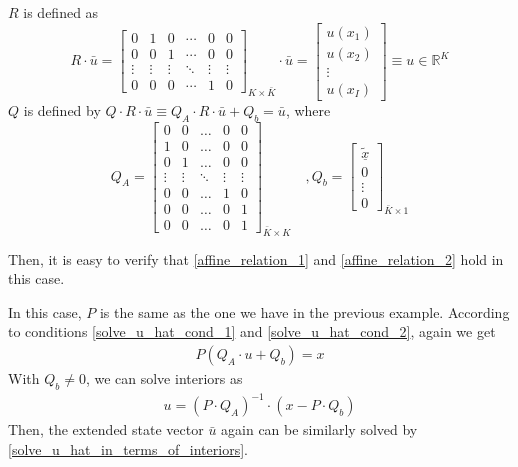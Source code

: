 \documentclass[11pt]{article}
\newcommand{\R}{\ensuremath{\mathbb{R}}}
\begin{document}
$R$ is defined as
\begin{equation}
R\cdot \bar{u} =\begin{bmatrix}
0&1&0&\cdots&0&0\\
0&0&1&\cdots&0&0\\
\vdots&\vdots&\vdots&\ddots&\vdots&\vdots\\
0&0&0&\cdots&1&0
\end{bmatrix}_{K\times\bar{K}}\cdot \bar{u}
=\begin{bmatrix}
u(x_1)\\
u(x_2)\\
\vdots\\
u(x_I)
\end{bmatrix} \equiv u\in \R^{K}
\end{equation}
$Q$ is defined by $Q\cdot R\cdot\bar{u}\equiv Q_A\cdot R\cdot\bar{u}+Q_b = \bar{u}$, where
\begin{equation}
Q_A = \begin{bmatrix}
0& 0&\dots&0&0\\
1&0&\dots&0&0\\
0&1&\dots&0&0\\
\vdots&\vdots&\ddots&\vdots&\vdots\\
0&0&\dots&1&0\\
0&0&\dots&0&1\\
0&0&\dots&0&1
\end{bmatrix}_{\bar{K}\times K}\quad , Q_b = \begin{bmatrix}
\underline{\tilde{x}}\\
0\\
\vdots\\
0
\end{bmatrix}_{\bar{K}\times 1}
\end{equation}

Then, it is easy to verify that \eqref{affine_relation_1} and \eqref{affine_relation_2} hold in this case.

In this case, $P$ is the same as the one we have in the previous example. According to conditions \eqref{solve_u_hat_cond_1} and \eqref{solve_u_hat_cond_2}, again we get
\begin{align}
P(Q_A\cdot u+Q_b) = x
\end{align}
With $Q_b\neq 0$, we can solve interiors as
\begin{align}
u = (P\cdot Q_A)^{-1}\cdot(x-P\cdot Q_b)
\end{align}
Then, the extended state vector $\bar{u}$ again can be similarly solved by \eqref{solve_u_hat_in_terms_of_interiors}.
\end{document}
